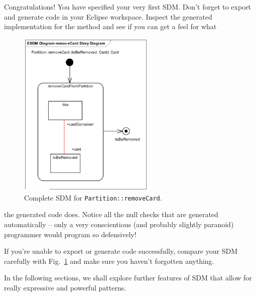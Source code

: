 Congratulations!  You have specified your very first SDM.  Don't forget to
export and generate code in your Eclipse workspace.  Inspect the generated
implementation for the method and see if you can get a feel for what\clearpage
 
\begin{figure}[htbp]
\begin{center}
  \includegraphics[width=0.58\textwidth]{pics/sdmBilder/removeCard/sdm15}
  \caption{Complete SDM for \texttt{Partition::removeCard}.}  
  \label{fig:sdm_complete_control_flow}
\end{center}
\end{figure}


the generated code does.  Notice all the null checks that are generated
automatically -- only a very conscientious (and probably slightly paranoid)
programmer would program so defensively!

If you're unable to export or generate code successfully, compare your SDM
carefully with Fig.~\ref{fig:sdm_complete_control_flow} and make sure you
haven't forgotten anything.

In the following sections, we shall explore further features of SDM that
allow for really expressive and powerful patterns.
